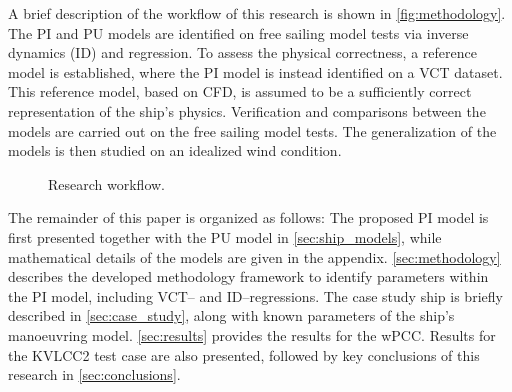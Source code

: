 A brief description of the workflow of this research is shown in \autoref{fig:methodology}.
The PI and PU models are identified on free sailing model tests \citep{alexandersson_system_2022,alexandersson_wpcc_2024} via inverse dynamics (ID) \citep{faber_inverse_2018} and regression. To assess the physical correctness, a reference model is established, where the PI model is instead identified on a VCT dataset. This reference model, based on CFD, is assumed to be a sufficiently correct representation of the ship's physics.
Verification and comparisons between the models are carried out on the free sailing model tests. The generalization of the models is then studied on an idealized wind condition.
%
\begin{figure}[h]
  \centering
  
  \caption{Research workflow.}
  \label{fig:methodology}
\end{figure}

The remainder of this paper is organized as follows: The proposed PI model is first presented together with the PU 
 model in \autoref{sec:ship_models}, while mathematical details of the models are given in the appendix. 
\autoref{sec:methodology} describes the developed methodology framework to identify parameters within the PI model, including VCT-- and ID--regressions. The case study ship is briefly described in \autoref{sec:case_study}, along with known parameters of the ship’s manoeuvring model. \autoref{sec:results} provides the results for the wPCC. Results for the KVLCC2 test case are also presented, followed by key conclusions of this research in \autoref{sec:conclusions}.